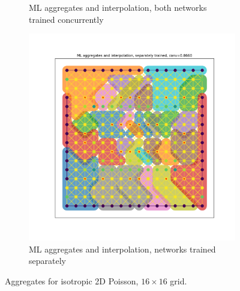 \documentclass{article}
\begin{document}
\begin{figure}[b]
\begin{subfigure}[b]{0.49\textwidth}
    \caption{ML aggregates and interpolation, both networks trained concurrently}
  \end{subfigure}
  \begin{subfigure}[b]{0.49\textwidth}
    \centering
    \includegraphics[width=\textwidth]{anisotropic_full_separate.pdf}
    \caption{ML aggregates and interpolation, networks trained separately}
  \end{subfigure}
  \caption{Aggregates for isotropic 2D Poisson, $16 \times 16$ grid.}
  \label{fig:2d_anisotropic}
\end{figure}
\end{document}
